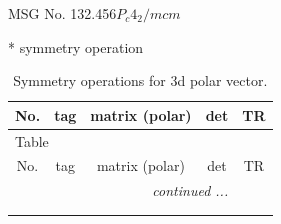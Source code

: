 \documentclass[fleqn,8pt]{jsarticle}
\begin{document}
\setcounter{MaxMatrixCols}{32}

\renewcommand{\tablename}{Table~}
\renewcommand{\figurename}{Figure~}
\begin{center}
\LARGE
MSG No. 132.456\quad$P_{c}4_{2}/mcm$
\end{center}
* symmetry operation
\renewcommand{\arraystretch}{1.3}
\begin{longtable}{ccccc}
\caption{Symmetry operations for 3d polar vector.}
 \\
 \hline \hline
No. & tag & matrix (polar) & det & TR \\ \hline \endfirsthead

\multicolumn{4}{l}{\tablename\ \thetable{}} \\
 \hline \hline
No. & tag & matrix (polar) & det & TR \\ \hline \endhead

 \hline \hline
\multicolumn{4}{r}{\footnotesize\it continued ...} \\ \endfoot

 \hline \hline
\multicolumn{4}{r}{} \\ \endlastfoot


\end{longtable}
\end{document}
